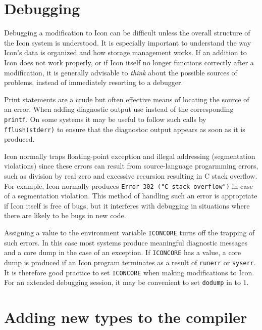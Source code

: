 \section{Debugging}

Debugging a modification to Icon can be difficult unless the overall structure of
the Icon system is understood. It is especially important to understand the way
Icon's data is organized and how storage management works. If an addition to
Icon does not work properly, or if Icon itself no longer functions correctly
after a modification, it is generally advisable to {\em think} about the
possible sources of problems, instead of immediately resorting to a debugger.

Print statements are a crude but often effective means of locating the source of
an error. When adding diagnostic output use
\noindent
instead of the corresponding \texttt{printf}. On some systems it may be useful
to follow such calls by \texttt{fflush(stderr)} to ensure that the diagnostoc
output appears as soon as it is produced.

Icon normally traps floating-point exception and illegal addressing
(segmentation violations) since these errors can result from source-language
progarmming errors, such as division by real zero and excessive recursion
resulting in C stack overflow. For example, Icon normally produces
\texttt{Error 302 ("C stack overflow")} in case of a segmentation violation.
This method of handling such an error is appropriate if Icon itself is free of
bugs, but it interferes with debugging in situations where there are likely to
be bugs in new code.

Assigning a value to the environment variable \texttt{ICONCORE} turns off the
trapping of such errors. In this case most systems produce meaningful diagnostic
messages and a core dump in the case of an exception.  If \texttt{ICONCORE} has
a value, a core dump is produced if an Icon program terminates as a result of
\texttt{runerr} or \texttt{syserr}.  It is therefore good practice to set
\texttt{ICONCORE} when making modifications to Icon. For an extended debugging
session, it may be convenient to set \texttt{dodump} in  to 1.

\section{Adding new types to the compiler}
\newcommand{\toklbra}{\texttt{~~(~~}}%
\newcommand{\tokrbra}{\texttt{~~)~~}}%
\newcommand{\toklcbra}{\texttt{~~\{~~}}%
\newcommand{\tokrcbra}{\texttt{~~\}~~}}%
\newcommand{\toklsbra}{\texttt{~~[~~}}%
\newcommand{\tokrsbra}{\texttt{~~]~~}}%
\newcommand{\tokcolon}{\texttt{~~:~~}}%
\newcommand{\cceq}{{\normalfont~~::=~~}}%
\newenvironment{ebnf}%
{\begin{specialcode}{\itshape}}%
{\end{specialcode}}%

